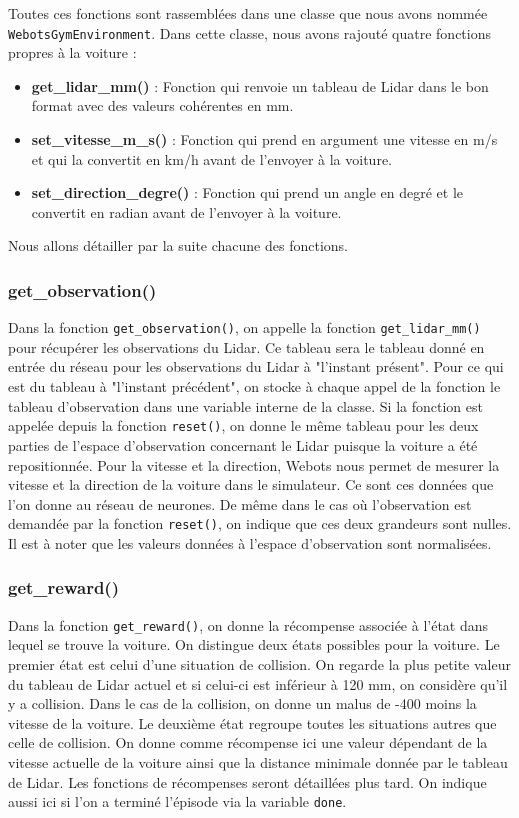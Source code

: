 \documentclass[french]{article}
\begin{document}
\vspace{0.5cm}
Toutes ces fonctions sont rassemblées dans une classe que nous avons nommée \texttt{WebotsGymEnvironment}. Dans cette classe, nous avons rajouté quatre fonctions propres à la voiture :
\begin{itemize}
\item \textbf{get\_lidar\_mm()} : Fonction qui renvoie un tableau de Lidar dans le bon format avec des valeurs cohérentes en mm.
\item \textbf{set\_vitesse\_m\_s()} : Fonction qui prend en argument une vitesse en m/s et qui la convertit en km/h avant de l'envoyer à la voiture.
\item \textbf{set\_direction\_degre()} : Fonction qui prend un angle en degré et le convertit en radian avant de l'envoyer à la voiture.
\end{itemize}
\noindent
Nous allons détailler par la suite chacune des fonctions.

\subsubsection*{get\_observation()}
Dans la fonction \texttt{get\_observation()}, on appelle la fonction \texttt{get\_lidar\_mm()} pour récupérer 
les observations du Lidar. Ce tableau sera le tableau donné en entrée du réseau pour les observations du Lidar 
à "l'instant présent". Pour ce qui est du tableau à "l'instant précédent", on stocke à chaque appel de la 
fonction le tableau d'observation dans une variable interne de la classe. Si la fonction est appelée depuis 
la fonction \texttt{reset()}, on donne le même tableau pour les deux parties de l'espace d'observation concernant 
le Lidar puisque la voiture a été repositionnée. Pour la vitesse et la direction, Webots nous permet de mesurer 
la vitesse et la direction de la voiture dans le simulateur. Ce sont ces données que l'on donne au réseau de neurones. 
De même dans le cas où l'observation est demandée par la fonction \texttt{reset()}, on indique que ces deux grandeurs 
sont nulles. Il est à noter que les valeurs données à l'espace d'observation sont normalisées.

\subsubsection*{get\_reward()}
Dans la fonction \texttt{get\_reward()}, on donne la récompense associée à l'état dans lequel se trouve la voiture. 
On distingue deux états possibles pour la voiture. Le premier état est celui d'une situation de collision. 
On regarde la plus petite valeur du tableau de Lidar actuel et si celui-ci est inférieur à 120 mm, on considère 
qu'il y a collision. Dans le cas de la collision, on donne un malus de -400 moins la vitesse de la voiture. 
Le deuxième état regroupe toutes les situations autres que celle de collision. On donne comme récompense ici 
une valeur dépendant de la vitesse actuelle de la voiture ainsi que la distance minimale donnée par le tableau de Lidar. 
Les fonctions de récompenses seront détaillées plus tard. On indique aussi ici si l'on a terminé l'épisode via la 
variable \texttt{done}.
\end{document}
